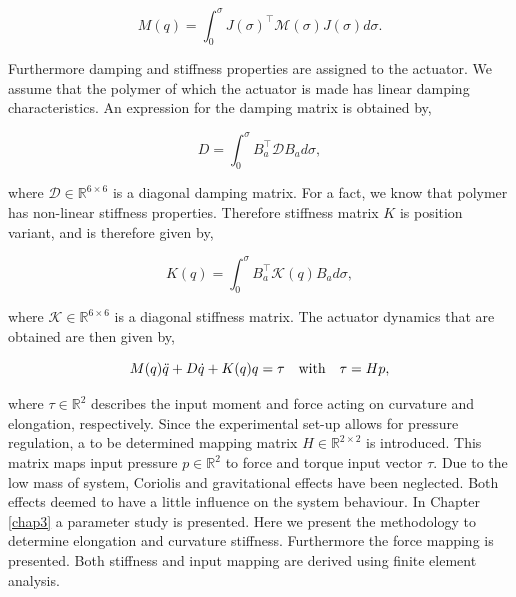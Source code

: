 \begin{equation}
    M(q) = \int_0^{\sigma} J(\sigma)^\top \mathcal{M}(\sigma)J(\sigma) d \sigma.
\end{equation}

Furthermore damping and stiffness properties are assigned to the actuator. We assume that the polymer of which the actuator is made has linear damping characteristics. An expression for the damping matrix is obtained by,

\begin{equation}
    D = \int_0^\sigma B_a^\top  \mathcal{D} B_a d\sigma,
\end{equation}

where $\mathcal{D} \in \mathbb{R}^{6 \times 6}$ is a diagonal damping matrix. For a fact, we know that polymer has non-linear stiffness properties. Therefore stiffness matrix $K$ is position variant, and is therefore given by,

\begin{equation}
    K(q) = \int_0^\sigma B_a ^\top \mathcal{K}(q) B_a d\sigma,
\end{equation}

where $\mathcal{K} \in \mathbb{R}^{6 \times 6}$ is a diagonal stiffness matrix. The actuator dynamics that are obtained are then given by,

\begin{equation}
    M(q)\Ddot{q} + D\dot{q} + K(q)q = \tau  \hspace{10pt} \text{with} \hspace{10pt} \tau = Hp,
    \label{eq2:simp_model}
\end{equation}

where $\tau \in \mathbb{R}^2$ describes the input moment and force acting on curvature and elongation, respectively. Since the experimental set-up allows for pressure regulation, a to be determined mapping matrix $H \in \mathbb{R}^{2\times2}$ is introduced. This matrix maps input pressure $p \in \mathbb{R}^2$ to force and torque input vector $\tau$. Due to the low mass of system, Coriolis and gravitational effects have been neglected. Both effects deemed to have a little influence on the system behaviour. In Chapter \ref{chap3} a parameter study is presented. Here we present the methodology to determine elongation and curvature stiffness. Furthermore the force mapping is presented. Both stiffness and input mapping are derived using finite element analysis.




